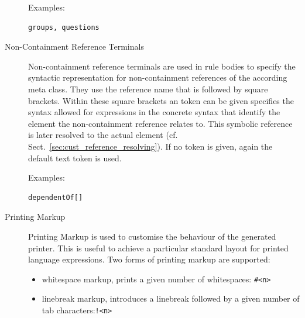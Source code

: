 \begin{description}
       Examples: \begin{verbatim}groups, questions\end{verbatim}

       \item[Non-Containment Reference Terminals] Non-containment reference
       terminals are used in rule bodies to specify the syntactic
       representation for non-containment references of the according meta
       class. They use the reference name that is followed by square brackets.
       Within these square brackets an token can be given specifies the syntax
       allowed for expressions in the concrete syntax that identify the element the
       non-containment reference relates to. This symbolic reference is later
       resolved to the actual element (cf.
       Sect.~\ref{sec:cust_reference_resolving}). If no token is given, again
       the default text token is used.

       Examples: \begin{verbatim}dependentOf[]\end{verbatim}
       
       \item[Printing Markup] Printing Markup is used to customise the behaviour
       of the generated printer. This is useful to achieve a particular standard
       layout for printed language expressions. Two forms of printing markup are
       supported: 
       \begin{itemize}
         \item whitespace markup, prints a given number of
         whitespaces: \texttt{\#<n>}
         \item linebreak markup, introduces a linebreak followed by a given 
         number of tab characters:\texttt{!<n>}
       \end{itemize}
    \end{description}

